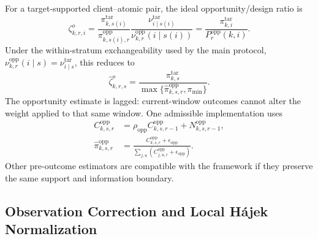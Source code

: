 \documentclass[letterpaper,journal]{IEEEtran}
\begin{document}
For a target-supported client--atomic pair, the ideal opportunity/design ratio is
\begin{equation}
 \zeta^{o}_{k,r,i}
 =
 \frac{\pi^{\mathrm{tar}}_{k,s(i)}}
      {\pi^{\mathrm{opp}}_{k,s(i),r}}
 \frac{\nu^{\mathrm{tar}}_{i\mid s(i)}}
      {\nu^{\mathrm{opp}}_{k,r}(i\mid s(i))}
 =
 \frac{\pi^{\mathrm{tar}}_{k,i}}
      {P_r^{\mathrm{opp}}(k,i)}.
 \label{eq:design_ratio_general}
\end{equation}
Under the within-stratum exchangeability used by the main protocol,
$\nu^{\mathrm{opp}}_{k,r}(i\mid s)=\nu^{\mathrm{tar}}_{i\mid s}$, this reduces to
\begin{equation}
 \widehat\zeta^{o}_{k,r,s}
 =
 \frac{\pi^{\mathrm{tar}}_{k,s}}
 {\max\{\widehat\pi^{\mathrm{opp}}_{k,s,r},\pi_{\min}\}}.
 \label{eq:design_ratio_simple}
\end{equation}
The opportunity estimate is lagged: current-window outcomes cannot alter the
weight applied to that same window.  One admissible implementation uses
\begin{align*}
 C^{\mathrm{opp}}_{k,s,r}
 &=
 \rho_{\mathrm{opp}}C^{\mathrm{opp}}_{k,s,r-1}
 +N^{\mathrm{opp}}_{k,s,r-1},\\
 \widehat\pi^{\mathrm{opp}}_{k,s,r}
 &=
 \frac{C^{\mathrm{opp}}_{k,s,r}+\epsilon_{\mathrm{opp}}}
 {\sum_{j,u}
 (C^{\mathrm{opp}}_{j,u,r}+\epsilon_{\mathrm{opp}})}.
\end{align*}
Other pre-outcome estimators are compatible with the framework if they preserve
the same support and information boundary.

\subsection{Observation Correction and Local H\'ajek Normalization}
\label{subsec:observation_hajek}
\end{document}
